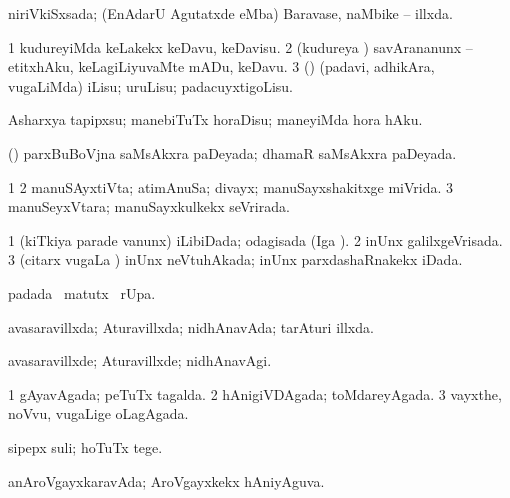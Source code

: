 {\bentry
{} 
\gl{\gu}
\expl{}
\bmng
niriVkiSxsada; (EnAdarU Agutatxde eMba) Baravase, naMbike -- illxda. 
\emng
\eentry

\bentry
{} 
\gl{\sakirx}
\expl{}
\bmng
\bnum
\num{1} kudureyiMda keLakekx keDavu, keDavisu. 
\num{2} (kudureya \vi) savArananunx -- etitxhAku, keLagiLiyuvaMte mADu, keDavu. 
\num{3} (\rUpa) (padavi, adhikAra, \mo vugaLiMda) iLisu; uruLisu; padacuyxtigoLisu. 
\enum
\emng
\eentry

\bentry
{} 
\gl{\akirx}
\expl{}
\bmng
Asharxya tapipxsu; manebiTuTx horaDisu; maneyiMda hora hAku. 
\emng
\eentry

\bentry
{} 
\gl{\gu}
\expl{}
\bmng
(\kerxY) parxBuBoVjna saMsAkxra paDeyada; dhamaR saMsAkxra paDeyada. 
\emng
\eentry

\bentry
{} 
\gl{\gu}
\expl{}
\bmng
\bnum
\num{1}  
\num{2} manuSAyxtiVta; atimAnuSa; divayx; manuSayxshakitxge miVrida. 
\num{3} manuSeyxVtara; manuSayxkulkekx seVrirada. 
\enum
\emng
\eentry

\bentry
{} 
\gl{\gu}
\expl{}
\bmng
\bnum
\num{1} (kiTkiya parade \mo vanunx) iLibiDada; odagisada (Iga \viparx). 
\num{2} inUnx galilxgeVrisada. 
\num{3} (citarx \mo vugaLa \vi) inUnx neVtuhAkada; inUnx parxdashaRnakekx iDada. 
\enum
\emng
\eentry

\bentry
{} 
\gl{\kirx}
\expl{}
\bmng
{} padada \BU\ matutx \BUkaq\ rUpa. 
\emng
\eentry

\bentry
{} 
\gl{\gu}
\expl{}
\bmng
avasaravillxda; Aturavillxda; nidhAnavAda; tarAturi illxda. 
\emng
\eentry

\bentry
{} 
\gl{\kirxvi}
\expl{}
\bmng
avasaravillxde; Aturavillxde; nidhAnavAgi. 
\emng
\eentry

\bentry
{} 
\gl{\gu}
\bmng
\bnum
\num{1} gAyavAgada; peTuTx tagalda. 
\num{2} hAnigiVDAgada; toMdareyAgada. 
\num{3} vayxthe, noVvu, \mo vugaLige oLagAgada. 
\enum
\emng
\eentry

\bentry
{} 
\gl{\akirx}
\expl{}
\bmng
sipepx suli; hoTuTx tege. 
\emng
\eentry

\bentry
{} 
\gl{\gu}
\expl{}
\bmng
anAroVgayxkaravAda; AroVgayxkekx hAniyAguva. 
\emng
\eentry

}
